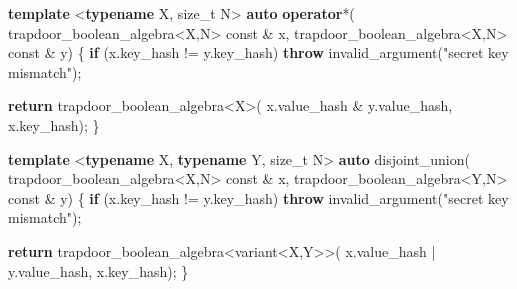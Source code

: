 \documentclass[
]{article}
\newenvironment{Shaded}{\begin{snugshade}}{\end{snugshade}}
\newcommand{\AttributeTok}[1]{\textcolor[rgb]{0.77,0.63,0.00}{#1}}
\newcommand{\ControlFlowTok}[1]{\textcolor[rgb]{0.13,0.29,0.53}{\textbf{#1}}}
\newcommand{\DataTypeTok}[1]{\textcolor[rgb]{0.13,0.29,0.53}{#1}}
\newcommand{\KeywordTok}[1]{\textcolor[rgb]{0.13,0.29,0.53}{\textbf{#1}}}
\newcommand{\NormalTok}[1]{#1}
\newcommand{\StringTok}[1]{\textcolor[rgb]{0.31,0.60,0.02}{#1}}
\begin{document}
\begin{Shaded}
\begin{Highlighting}[]
\KeywordTok{template}\NormalTok{ \textless{}}\KeywordTok{typename}\NormalTok{ X, }\DataTypeTok{size\_t}\NormalTok{ N\textgreater{}}
\KeywordTok{auto} \KeywordTok{operator}\NormalTok{*(}
\NormalTok{    trapdoor\_boolean\_algebra\textless{}X,N\textgreater{} }\AttributeTok{const}\NormalTok{ \& x,}
\NormalTok{    trapdoor\_boolean\_algebra\textless{}X,N\textgreater{} }\AttributeTok{const}\NormalTok{ \& y)}
\NormalTok{\{}
    \ControlFlowTok{if}\NormalTok{ (x.key\_hash != y.key\_hash)}
        \ControlFlowTok{throw}\NormalTok{ invalid\_argument(}\StringTok{"secret key mismatch"}\NormalTok{);}

    \ControlFlowTok{return}\NormalTok{ trapdoor\_boolean\_algebra\textless{}X\textgreater{}(}
\NormalTok{        x.value\_hash \& y.value\_hash,}
\NormalTok{        x.key\_hash);}
\NormalTok{\}}
\end{Highlighting}
\end{Shaded}

\begin{Shaded}
\begin{Highlighting}[]
\KeywordTok{template}\NormalTok{ \textless{}}\KeywordTok{typename}\NormalTok{ X, }\KeywordTok{typename}\NormalTok{ Y, }\DataTypeTok{size\_t}\NormalTok{ N\textgreater{}}
\KeywordTok{auto}\NormalTok{ disjoint\_union(}
\NormalTok{    trapdoor\_boolean\_algebra\textless{}X,N\textgreater{} }\AttributeTok{const}\NormalTok{ \& x,}
\NormalTok{    trapdoor\_boolean\_algebra\textless{}Y,N\textgreater{} }\AttributeTok{const}\NormalTok{ \& y)}
\NormalTok{\{}
    \ControlFlowTok{if}\NormalTok{ (x.key\_hash != y.key\_hash)}
        \ControlFlowTok{throw}\NormalTok{ invalid\_argument(}\StringTok{"secret key mismatch"}\NormalTok{);}

    \ControlFlowTok{return}\NormalTok{ trapdoor\_boolean\_algebra\textless{}variant\textless{}X,Y\textgreater{}\textgreater{}(}
\NormalTok{        x.value\_hash | y.value\_hash,}
\NormalTok{        x.key\_hash);}
\NormalTok{\}}
\end{Highlighting}
\end{Shaded}
\end{document}
